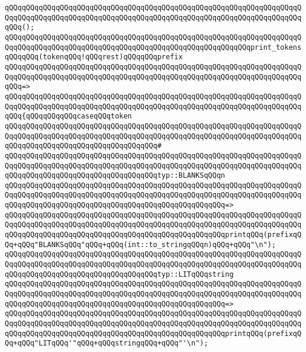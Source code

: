 \verb|qQQqqQQqqQQqqQQqqQQqqQQqqQQqqQQqqQQqqQQqqQQqqQQqqQQqqQQqqQQqqQQqqQQqqQQqqQQqqQQqqQQqqQQqqQQqqQQqqQQqqQQqqQQqqQQqqQQqqQQqqQQqqQQqqQQqqQQqqQQqqQQq();|\newline
\newline
\verb|qQQqqQQqqQQqqQQqqQQqqQQqqQQqqQQqqQQqqQQqqQQqqQQqqQQqqQQqqQQqqQQqqQQqqQQqqQQqqQQqqQQqqQQqqQQqqQQqqQQqqQQqqQQqqQQqqQQqqQQqqQQqqQQqprint_tokensqQQqqQQq(tokenqQQq!qQQqrest)qQQqqQQqprefix|\newline
\verb|qQQqqQQqqQQqqQQqqQQqqQQqqQQqqQQqqQQqqQQqqQQqqQQqqQQqqQQqqQQqqQQqqQQqqQQqqQQqqQQqqQQqqQQqqQQqqQQqqQQqqQQqqQQqqQQqqQQqqQQqqQQqqQQqqQQqqQQqqQQqqQQq=>|\newline
\verb|qQQqqQQqqQQqqQQqqQQqqQQqqQQqqQQqqQQqqQQqqQQqqQQqqQQqqQQqqQQqqQQqqQQqqQQqqQQqqQQqqQQqqQQqqQQqqQQqqQQqqQQqqQQqqQQqqQQqqQQqqQQqqQQqqQQqqQQqqQQqqQQq{qQQqqQQqqQQqcaseqQQqtoken|\newline
\verb|qQQqqQQqqQQqqQQqqQQqqQQqqQQqqQQqqQQqqQQqqQQqqQQqqQQqqQQqqQQqqQQqqQQqqQQqqQQqqQQqqQQqqQQqqQQqqQQqqQQqqQQqqQQqqQQqqQQqqQQqqQQqqQQqqQQqqQQqqQQqqQQqqQQqqQQqqQQqqQQqqQQqqQQqqQQqqQQq#|\newline
\verb|qQQqqQQqqQQqqQQqqQQqqQQqqQQqqQQqqQQqqQQqqQQqqQQqqQQqqQQqqQQqqQQqqQQqqQQqqQQqqQQqqQQqqQQqqQQqqQQqqQQqqQQqqQQqqQQqqQQqqQQqqQQqqQQqqQQqqQQqqQQqqQQqqQQqqQQqqQQqqQQqqQQqqQQqqQQqqQQqtyp::BLANKSqQQqn|\newline
\verb|qQQqqQQqqQQqqQQqqQQqqQQqqQQqqQQqqQQqqQQqqQQqqQQqqQQqqQQqqQQqqQQqqQQqqQQqqQQqqQQqqQQqqQQqqQQqqQQqqQQqqQQqqQQqqQQqqQQqqQQqqQQqqQQqqQQqqQQqqQQqqQQqqQQqqQQqqQQqqQQqqQQqqQQqqQQqqQQqqQQqqQQqqQQqqQQq=>|\newline
\verb|qQQqqQQqqQQqqQQqqQQqqQQqqQQqqQQqqQQqqQQqqQQqqQQqqQQqqQQqqQQqqQQqqQQqqQQqqQQqqQQqqQQqqQQqqQQqqQQqqQQqqQQqqQQqqQQqqQQqqQQqqQQqqQQqqQQqqQQqqQQqqQQqqQQqqQQqqQQqqQQqqQQqqQQqqQQqqQQqqQQqqQQqqQQqqQQqprintqQQq(prefixqQQq+qQQq"BLANKSqQQq"qQQq+qQQq(int::to_stringqQQqn)qQQq+qQQq"\n");|\newline
\newline
\verb|qQQqqQQqqQQqqQQqqQQqqQQqqQQqqQQqqQQqqQQqqQQqqQQqqQQqqQQqqQQqqQQqqQQqqQQqqQQqqQQqqQQqqQQqqQQqqQQqqQQqqQQqqQQqqQQqqQQqqQQqqQQqqQQqqQQqqQQqqQQqqQQqqQQqqQQqqQQqqQQqqQQqqQQqqQQqqQQqtyp::LITqQQqstring|\newline
\verb|qQQqqQQqqQQqqQQqqQQqqQQqqQQqqQQqqQQqqQQqqQQqqQQqqQQqqQQqqQQqqQQqqQQqqQQqqQQqqQQqqQQqqQQqqQQqqQQqqQQqqQQqqQQqqQQqqQQqqQQqqQQqqQQqqQQqqQQqqQQqqQQqqQQqqQQqqQQqqQQqqQQqqQQqqQQqqQQqqQQqqQQqqQQqqQQq=>|\newline
\verb|qQQqqQQqqQQqqQQqqQQqqQQqqQQqqQQqqQQqqQQqqQQqqQQqqQQqqQQqqQQqqQQqqQQqqQQqqQQqqQQqqQQqqQQqqQQqqQQqqQQqqQQqqQQqqQQqqQQqqQQqqQQqqQQqqQQqqQQqqQQqqQQqqQQqqQQqqQQqqQQqqQQqqQQqqQQqqQQqqQQqqQQqqQQqqQQqprintqQQq(prefixqQQq+qQQq"LITqQQq'"qQQq+qQQqstringqQQq+qQQq"'\n");|\newline
